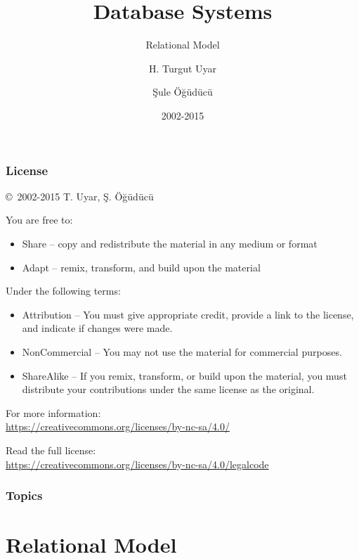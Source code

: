 \documentclass[dvipsnames]{beamer}
\title{Database Systems}
\subtitle{Relational Model}
\author{H. Turgut Uyar \and Şule Öğüdücü}
\date{2002-2015}
\theoremstyle{plain}
\begin{document}
\begin{frame}
  \titlepage
\end{frame}

\begin{frame}
  \frametitle{License}

  \hfill
  \copyright~2002-2015 T. Uyar, Ş. Öğüdücü

  \vfill
  \begin{footnotesize}
    You are free to:
    \begin{itemize}
      \itemsep0em
      \item Share -- copy and redistribute the material in any medium or format
      \item Adapt -- remix, transform, and build upon the material
    \end{itemize}

    Under the following terms:
    \begin{itemize}
      \itemsep0em
      \item Attribution -- You must give appropriate credit, provide a link to
        the license, and indicate if changes were made.

      \item NonCommercial -- You may not use the material for commercial
        purposes.

      \item ShareAlike -- If you remix, transform, or build upon the material,
        you must distribute your contributions under the same license as the
        original.
    \end{itemize}
  \end{footnotesize}

  \begin{small}
    For more information:\\
    \url{https://creativecommons.org/licenses/by-nc-sa/4.0/}

    \smallskip
    Read the full license:\\
    \url{https://creativecommons.org/licenses/by-nc-sa/4.0/legalcode}
  \end{small}
\end{frame}

\begin{frame}
  \frametitle{Topics}
  \tableofcontents
\end{frame}

\lstset{language=TutorialD}

\section{Relational Model}
\end{document}
